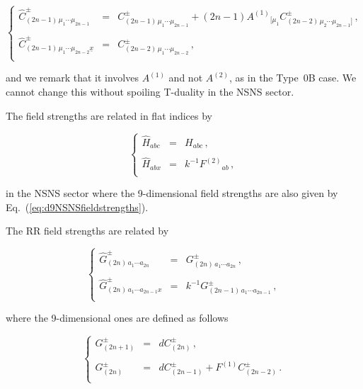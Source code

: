 \documentclass[12pt,a4paper]{article}
\begin{document}
\begin{equation}
\left\{
\begin{array}{rcl}
\hat{C}^{\pm}_{(2n-1)\, \mu_{1}\cdots\mu_{2n-1}}
& = & 
C^{\pm}_{(2n-1)\, \mu_{1}\cdots\mu_{2n-1}}
+(2n-1) A^{(1)}{}_{[\mu_{1}}
C^{\pm}_{(2n-2)\, \mu_{2}\cdots\mu_{2n-1}]}\, , \\
& & \\
\hat{C}^{\pm}_{(2n-1)\, \mu_{1}\cdots\mu_{2n-2}\underline{x}}
& = & 
C^{\pm}_{(2n-2)\, \mu_{1}\cdots\mu_{2n-2}}\, ,\\
\end{array}
\right.
\label{eq:9dRR0A-1}
\end{equation}


\noindent and we remark that it involves $A^{(1)}$ and not 
$A^{(2)}$, as in the Type~0B case. We cannot change this without 
spoiling T-duality in the NSNS sector.

The field strengths are related in flat indices by

\begin{equation}
\left\{
\begin{array}{rcl}
\hat{H}_{abc} & = & H_{abc}\, ,\\
& & \\
\hat{H}_{abx} & = & k^{-1}F^{(2)}{}_{ab}\, ,\\
\end{array}
\right.
\end{equation}

\noindent in the NSNS sector where the 9-dimensional field strengths
are also given by Eq.~(\ref{eq:d9NSNSfieldstrengths}). 

The RR field strengths are related by

\begin{equation}
\left\{
\begin{array}{rcl}
\hat{G}^{\pm}_{(2n)\, a_{1}\cdots a_{2n}} & = & 
G^{\pm}_{(2n)\, a_{1}\cdots a_{2n}}\, ,\\
& & \\
\hat{G}^{\pm}_{(2n)\, a_{1}\cdots a_{2n-1}x} & = & 
k^{-1}G^{\pm}_{(2n-1)\, a_{1}\cdots a_{2n-1}}\, ,\\
\end{array}
\right.
\end{equation}

\noindent where the 9-dimensional ones  are defined as follows

\begin{equation}
\label{eq:9dRRfieldstrengths0A-1}
\left\{
\begin{array}{lcl}
G_{(2n+1)}^{\pm} & = & dC_{(2n)}^{\pm} \, ,\\
& & \\
G_{(2n)}^{\pm} & = & dC_{(2n-1)}^{\pm} +F^{(1)} C_{(2n-2)}^{\pm}\, .\\
\end{array}
\right.
\end{equation}
\end{document}
